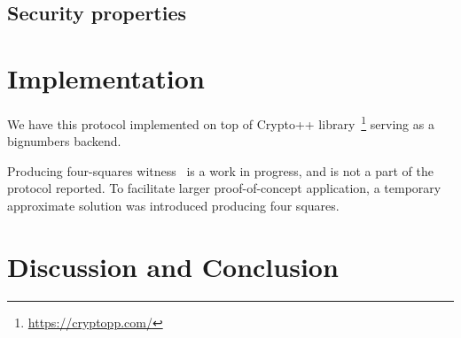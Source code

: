 \documentclass{article}
\begin{document}
\subsection{Security properties}


\section{Implementation}

We have this protocol implemented on top of {Crypto++} library~\footnote{\url{https://cryptopp.com/}}
serving as a bignumbers backend.

Producing four-squares witness~\cite{PollackTrevino} is a work in progress, and is not a part of the protocol reported.
To facilitate larger proof-of-concept application, a temporary approximate solution was introduced producing four squares.

\section{Discussion and Conclusion}


% 


\end{document}
